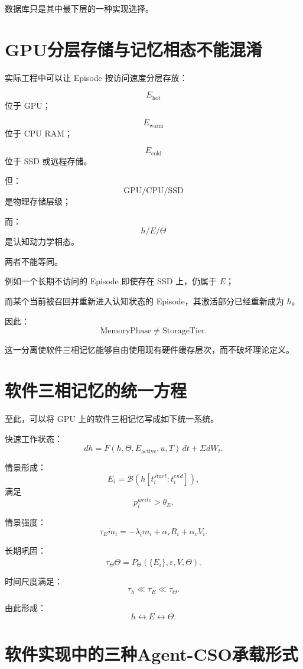 数据库只是其中最下层的一种实现选择。

\section{GPU分层存储与记忆相态不能混淆}

实际工程中可以让 Episode 按访问速度分层存放：

\[
E_{\mathrm{hot}}
\]
位于 GPU；

\[
E_{\mathrm{warm}}
\]
位于 CPU RAM；

\[
E_{\mathrm{cold}}
\]
位于 SSD 或远程存储。

但：
\[
\boxed{
\mathrm{GPU/CPU/SSD}
}
\]
是物理存储层级；

而：
\[
\boxed{
h/E/\Theta
}
\]
是认知动力学相态。

两者不能等同。

例如一个长期不访问的 Episode 即使存在 SSD 上，仍属于 $E$；

而某个当前被召回并重新进入认知状态的 Episode，其激活部分已经重新成为 $h$。

因此：
\[
\boxed{
\mathrm{MemoryPhase}
\neq
\mathrm{StorageTier}.
}
\]

这一分离使软件三相记忆能够自由使用现有硬件缓存层次，而不破坏理论定义。

\section{软件三相记忆的统一方程}

至此，可以将 GPU 上的软件三相记忆写成如下统一系统。

快速工作状态：
\[
dh
=
F
(
h,
\Theta,
E_{\mathrm{active}},
u,
T
)\,dt
+
\Sigma dW_t.
\]

情景形成：
\[
E_i
=
\mathcal B
\left(
h[t_i^{start}:t_i^{end}]
\right),
\]
满足
\[
p_i^{write}>\theta_E.
\]

情景强度：
\[
\tau_E\dot m_i
=
-\lambda_i m_i
+
\alpha_rR_i
+
\alpha_vV_i.
\]

长期巩固：
\[
\tau_\Theta\dot\Theta
=
P_\Theta
(
\{E_i\},
\varepsilon,
V,
\Theta
).
\]

时间尺度满足：
\[
\boxed{
\tau_h
\ll
\tau_E
\ll
\tau_\Theta.
}
\]

由此形成：
\[
\boxed{
h
\leftrightarrow
E
\leftrightarrow
\Theta.
}
\]

\section{软件实现中的三种Agent-CSO承载形式}

